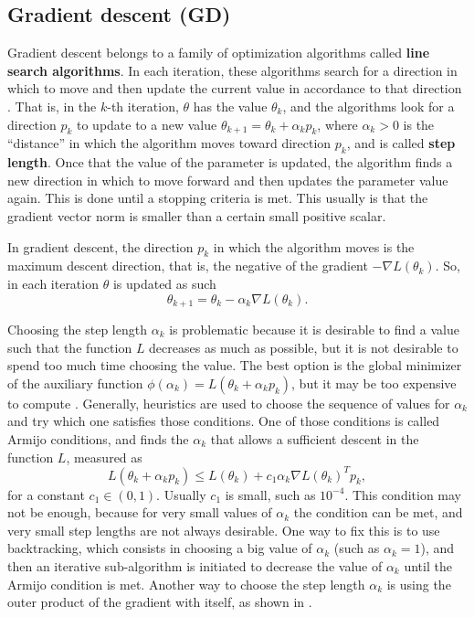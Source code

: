 \subsection{Gradient descent (GD)}

Gradient descent belongs to a family of optimization algorithms called \textbf{line search algorithms}. In each iteration, these algorithms search for a direction in which to move and then update the current value in accordance to that direction \cite[p.~19]{nocedal2006numerical}. That is, in the $k$-th iteration, $\theta$ has the value $\theta_k$, and the algorithms look for a direction $p_k$ to update to a new value $\theta_{k+1} = \theta_k + \alpha_k p_k$, where $\alpha_k > 0$ is the ``distance'' in which the algorithm moves toward direction $p_k$, and is called \textbf{step length}. Once that the value of the parameter is updated, the algorithm finds a new direction in which to move forward and then updates the parameter value again. This is done until a stopping criteria is met. This usually is that the gradient vector norm is smaller than a certain small positive scalar.

In gradient descent, the direction $p_k$ in which the algorithm moves is the maximum descent direction, that is, the negative of the gradient $-\nabla L(\theta_k)$. So, in each iteration $\theta$ is updated as such
\begin{equation}
  \label{eq:parameter_update_gd}
  \theta_{k+1} = \theta_k - \alpha_k \nabla L(\theta_k).
\end{equation}

Choosing the step length $\alpha_k$ is problematic because it is desirable to find a value such that the function $L$ decreases as much as possible, but it is not desirable to spend too much time choosing the value. The best option is the global minimizer of the auxiliary function $\phi(\alpha_k) = L(\theta_k + \alpha_k p_k)$, but it may be too expensive to compute \cite[p.~31]{nocedal2006numerical}. Generally, heuristics are used to choose the sequence of values for $\alpha_k$ and try which one satisfies those conditions. One of those conditions is called Armijo conditions, and finds the $\alpha_k$ that allows a sufficient descent in the function $L$, measured as
\begin{equation}
    L(\theta_k + \alpha_k p_k) \leq L(\theta_k) + c_1 \alpha_k \nabla L(\theta_k)^T p_k,
\end{equation}
for a constant $c_1 \in (0, 1)$. Usually $c_1$ is small, such as $10^{-4}$. This condition may not be enough, because for very small values of $\alpha_k$ the condition can be met, and very small step lengths are not always desirable. One way to fix this is to use backtracking, which consists in choosing a big value of $\alpha_k$ (such as $\alpha_k = 1$), and then an iterative sub-algorithm is initiated to decrease the value of $\alpha_k$ until the Armijo condition is met. Another way to choose the step length $\alpha_k$ is using the outer product of the gradient with itself, as shown in \cite{duchi2011adaptive}.


